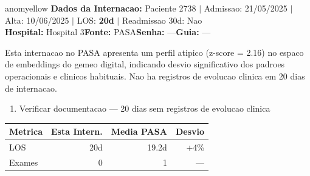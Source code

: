 \documentclass[a4paper,10pt]{article}
\begin{document}
\begin{anomalycard}[Internacao 160333 | PASA | MODERADO (z=2.16)]{anomyellow}
\textbf{Dados da Internacao:} Paciente 2738 $\mid$ Admissao: 21/05/2025 $\mid$ Alta: 10/06/2025 $\mid$ LOS: \textbf{20d} $\mid$ Readmissao 30d: Nao\\
\textbf{Hospital:} Hospital 3\quad\textbf{Fonte:} PASA\quad\textbf{Senha:} ---\quad\textbf{Guia:} ---\\
\vspace{2pt}\begin{tcolorbox}[colback=severityred!20,colframe=anomyellow,title={\textbf{Interpretacao de Negocio}},fonttitle=\bfseries\small,left=4pt,right=4pt,top=3pt,bottom=3pt]
{\small Esta internacao no PASA apresenta um perfil atipico (z-score = 2.16) no espaco de embeddings do gemeo digital, indicando desvio significativo dos padroes operacionais e clinicos habituais. Nao ha registros de evolucao clinica em 20 dias de internacao.}
\end{tcolorbox}
\begin{tcolorbox}[colback=severityyellow!30,colframe=anomorange,title={\textbf{Recomendacoes Especificas}},fonttitle=\bfseries\small,left=4pt,right=4pt,top=3pt,bottom=3pt]
\begin{enumerate}[nosep,leftmargin=16pt]
\item {\small Verificar documentacao --- 20 dias sem registros de evolucao clinica}
\end{enumerate}
\end{tcolorbox}
\begin{center}\begin{tabular}{l r r r}\toprule\textbf{Metrica} & \textbf{Esta Intern.} & \textbf{Media PASA} & \textbf{Desvio} \\\midrule
LOS & 20d & 19.2d & +4\% \\
Exames & 0 & 1 & --- \\
\bottomrule\end{tabular}\end{center}


\end{anomalycard}
\end{document}
